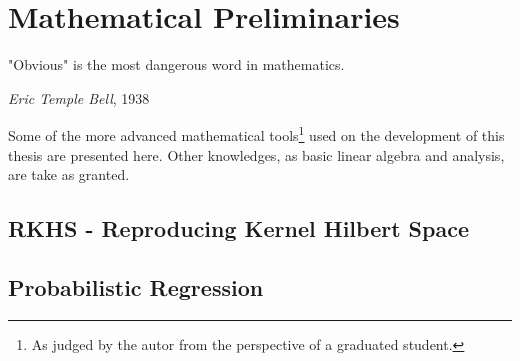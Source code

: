 \chapter{Mathematical Preliminaries}

\epigraph{"Obvious" is the most dangerous word in mathematics.}{\textit{Eric Temple
Bell}, 1938}

Some of the more advanced mathematical tools\footnote{As judged by the autor
from the perspective of a graduated student.} used on the development of this
thesis are presented here.
Other knowledges, as basic linear algebra and analysis, are take as granted.


\section{RKHS - Reproducing Kernel Hilbert Space}
\section{Probabilistic Regression}
